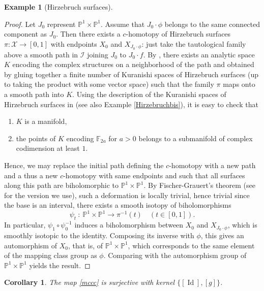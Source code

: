 \documentclass[JEP,XML,SOM,Unicode]{cedram}
\let\mathcal\mathscr
\DeclareMathOperator{\Id}{Id}
\theoremstyle{plain}
\newtheorem{corollary}[theorem]{Corollary}
\theoremstyle{definition}
\newtheorem{example}[theorem]{Example}
\theoremstyle{remark}
\numberwithin{equation}{section}
\newcommand{\cI}{\mathcal{I}}
\begin{document}
\begin{example}[Hirzebruch surfaces]
\begin{proof}
Let $J_0$ represent $\mathbb P^1\times\mathbb P^1$.
Assume that $J_0\cdot \phi$ belongs to the same connected component as $J_0$. Then there exists a $c$-homotopy of Hirzebruch surfaces \hbox{$\pi : \mathcal X\!\to\![0,1]$} with endpoints $X_0$ and $X_{J_0\cdot \phi}$: just take the tautological family above a smooth path in $\cI$ joining $J_0$ to $J_0\cdot f$. By \cite[Th.\,8.1]{circle}, there exists an analytic space $K$ encoding the complex structures on a neighborhood of the path and obtained by gluing together a finite number of Kuranishi spaces of Hirzebruch surfaces (up to taking the product with some vector space) such that the family $\pi$ maps onto a smooth path into $K$. Using the description of the Kuranishi spaces of Hirzebruch surfaces in \cite[p.\,21]{Cat} (see also Example \ref{Hirzebruchbis}), it is easy to check that
\begin{enumerate}
\item
$K$ is a manifold,
\item
the points of $K$ encoding $\mathbb F_{2a}$ for $a>0$ belongs to a submanifold of complex codimension at least $1$.
\end{enumerate}
Hence, we may replace the initial path defining the $c$-homotopy with a new path and a thus a new $c$-homotopy with same endpoints and such that all surfaces along this path are biholomorphic to $\mathbb P^1\times\mathbb P^1$. By Fischer-Grauert's theorem (see \cite{PS} for the version we use), such a deformation is locally trivial, hence trivial since the base is an interval, \ie there exists a smooth isotopy of biholomorphisms
\begin{equation}
\label{isotopy}
\psi_t\ :\ \mathbb P^1\times\mathbb P^1\to \pi^{-1}(t)\quad (t\in [0,1]).
\end{equation}
In particular, $\psi_1\circ\psi_0^{-1}$
induces a biholomorphism between $X_0$ and $X_{J_0\cdot\phi}$, which is smoothly isotopic to the identity. Composing its inverse with $\phi$, this gives an automorphism of $X_0$, that is, of $\mathbb P^1\times\mathbb P^1$, which corresponds to the same element of the mapping class group as $\phi$. Comparing with the automorphism group of $\mathbb P^1\times\mathbb P^1$ yields the result.
\end{proof}

\begin{corollary}
\label{Hirzebruchcc2}
The map \eqref{mccc} is surjective with kernel $\{[\Id], [g]\}$.
\end{corollary}


\end{example}
\end{document}

